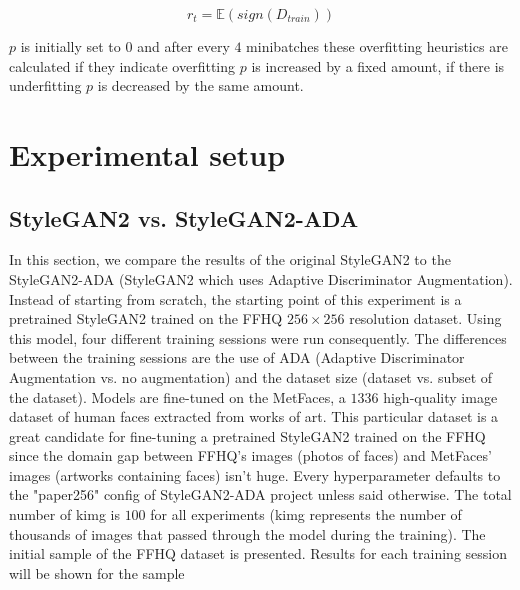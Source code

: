 \documentclass[conference]{IEEEtran}
\begin{document}
\begin{equation}
	r_t = \mathbb{E}(sign(D_{train}))
\end{equation}

$p$ is initially set to $0$ and after every $4$ minibatches these overfitting heuristics are calculated if they indicate overfitting $p$ is increased by a fixed amount, if there is underfitting $p$ is decreased by the same amount.


\section{Experimental setup}

\subsection{StyleGAN2 vs. StyleGAN2-ADA}
In this section, we compare the results of the original StyleGAN2 to the StyleGAN2-ADA (StyleGAN2 which uses Adaptive Discriminator Augmentation). Instead of starting from scratch, the starting point of this experiment is a pretrained StyleGAN2 trained on the FFHQ $256 \times 256$ resolution dataset. Using this model, four different training sessions were run consequently. The differences between the training sessions are the use of ADA (Adaptive Discriminator Augmentation vs. no augmentation) and the dataset size (dataset vs. subset of the dataset). Models are fine-tuned on the MetFaces, a $1336$ high-quality image dataset of human faces extracted from works of art. This particular dataset is a great candidate for fine-tuning a pretrained StyleGAN2 trained on the FFHQ since the domain gap between FFHQ’s images (photos of faces) and MetFaces’ images (artworks containing faces) isn’t huge. Every hyperparameter defaults to the "paper256" config of StyleGAN2-ADA project unless said otherwise. The total number of kimg is $100$ for all experiments (kimg represents the number of thousands of images that passed through the model during the training). The initial sample of the FFHQ dataset is presented. Results for each training session will be shown for the sample
\end{document}

